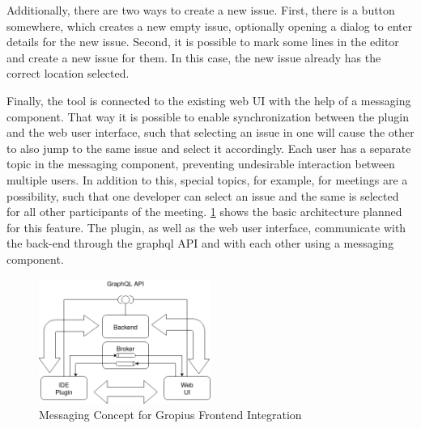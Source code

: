 Additionally, there are two ways to create a new issue.
First, there is a button somewhere, which creates a new empty issue, 
optionally opening a dialog to enter details for the new issue.
Second, it is possible to mark some lines in the editor and create a new issue for them.
In this case, the new issue already has the correct location selected.

Finally, the tool is connected to the existing web \gls{UI} with the help of a messaging component.
That way it is possible to enable synchronization between the plugin and the web user interface, 
such that selecting an issue in one will cause the other to also jump to the same issue and select it accordingly. 
Each user has a separate topic in the messaging component, preventing undesirable interaction between multiple users. 
In addition to this, special topics, for example, for meetings are a possibility, 
such that one developer can select an issue and the same is selected for all other participants of the meeting. 
\cref{fig:c3:concept_gropius_messaging} shows the basic architecture planned for this feature. 
The plugin, as well as the web user interface, communicate with the back-end through the \gls{graphql} \gls{API} and with each other using a messaging component.

\begin{figure}[!h]
	\centering
	\includegraphics[width=0.5\textwidth]{graphics/concept_gropius_frontend_messaging.png}
	\caption{Messaging Concept for Gropius Frontend Integration}
	\label{fig:c3:concept_gropius_messaging}
\end{figure}